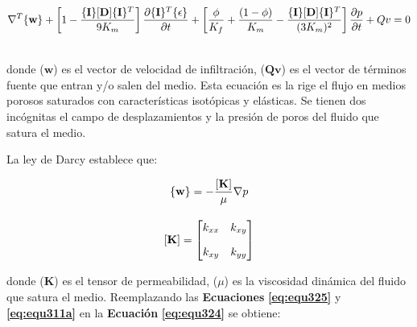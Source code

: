 \begin{ceqn} %
\begin{gather}\label{eq:equ324}
\normalsize{\nabla^T \{\mathbf{w}\} + \left[1-\frac{\{\mathbf{I}\}[\mathbf{D}]\{\mathbf{I}\}^T}{9K_m}\right]\frac{\partial \{\mathbf{I}\}^T \{\mathbf{\epsilon}\}}{\partial t} +\left[\frac{\phi}{K_f}+\frac{(1-\phi)}{K_m}-\frac{\{\mathbf{I}\}[\mathbf{D}]\{\mathbf{I}\}^T}{(3K_{m})^{2}}\right]\frac{\partial p}{\partial t} + Qv = 0}
\end{gather}   
\end{ceqn}
\\
donde ($\mathbf{w}$) es el vector de velocidad de infiltración, ($\mathbf{Qv}$) es el vector de términos fuente que entran y/o salen del medio. Esta ecuación es la rige el flujo en medios porosos saturados con características isotópicas y elásticas. Se tienen dos incógnitas el campo de desplazamientos y la presión de poros del fluido que satura el medio.\bigskip

La ley de Darcy\cite{Zienkiewicz1999ComputationalGeomechanics} establece que:
\begin{ceqn} 
\begin{subequations} \label{eq:equ325} 
\begin{gather}
\normalsize{\{\mathbf{w}\}=-\frac{[\mathbf{K}]}{\mu}\nabla p} \label{eq:equ325a}\\[10pt]
\normalsize{[\mathbf{K}]=\begin{bmatrix} 
k_{xx} & k_{xy}\\[1em]
k_{xy} & k_{yy}
\end{bmatrix} } \label{eq:equ325b}
\end{gather}  
\end{subequations} 
\end{ceqn}
donde ($\mathbf{K}$) es el tensor de permeabilidad, ($\mu$) es la viscosidad dinámica del fluido que satura el medio. Reemplazando las \textbf{Ecuaciones} \textbf{\ref{eq:equ325}} y \textbf{\ref{eq:equ311a}} en la \textbf{Ecuación} \textbf{\ref{eq:equ324}} se obtiene:

